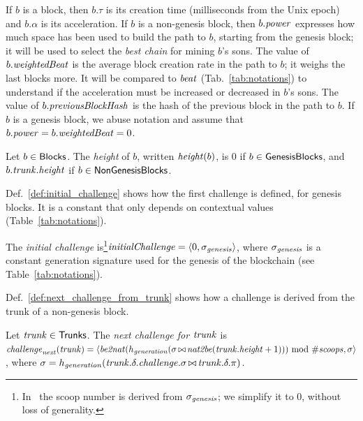%
If $b$ is a block, then $b.\tau$ is its creation time (milliseconds from the Unix epoch)
and $b.\alpha$ is its acceleration. If $b$ is a non-genesis block, then
$b.{\mathit{power}}$ expresses how much space has been used to build the path to $b$,
starting from the genesis block; it will be used to select the \emph{best chain} for mining
$b$'s sons. The value of $b.\mathit{weightedBeat}$ is the average block creation rate
in the path to $b$; it weighs the last blocks more. It will be
compared to ${\mathit{beat}}$ (Tab.~\ref{tab:notations}) to understand if the acceleration
must be increased or decreased in $b$'s sons.
The value of $b.{\mathit{previousBlockHash}}$ is the hash of the previous block in the path to $b$.
If $b$ is a genesis block, we abuse notation and assume that $b.{\mathit{power}}=b.\mathit{weightedBeat}=0$.

\begin{definition}\label{def:block_height}
  Let $b\in{\mathsf{Blocks}}$. The \emph{height} of $b$, written ${\mathit{height}}(b)$,
  is $0$ if $b\in{\mathsf{GenesisBlocks}}$, and $b.{\mathit{trunk}}.{\mathit{height}}$ if $b\in{\mathsf{NonGenesisBlocks}}$.  
\end{definition}
%
Def.~\ref{def:initial_challenge} shows how the first challenge is defined, for genesis blocks.
It is a constant that only depends on contextual values (Table~\ref{tab:notations}).
%
\begin{definition}[$\initialchallenge$]\label{def:initial_challenge}
  The \emph{initial challenge} is\footnote{In~\cite{SignumPlotting}
  the scoop number is derived from $\sigma_{\mathit{genesis}}$; we simplify it to $0$, without loss
  of generality.}${\mathit{initialChallenge}}=\langle 0,\sigma_{\mathit{genesis}}\rangle$,
  where $\sigma_{\mathit{genesis}}$ is a constant generation signature used for the genesis of the blockchain
  (see Table~\ref{tab:notations}).
\end{definition}
%
Def.~\ref{def:next_challenge_from_trunk}
shows how a challenge is derived from the trunk of a non-genesis block.
%
\begin{definition}[$\nextchallenge(\trunk)$]\label{def:next_challenge_from_trunk}
  Let ${\mathit{trunk}}\in{\mathsf{Trunks}}$. The \emph{next challenge for ${\mathit{trunk}}$} is
  $%
  \nextchallenge(\trunk)=
    \langle\betonat(h_\generation(\sigma\append\nattobe(\trunk.\height+1)))\text{ mod }\numberofscoops,\sigma\rangle
  $, %
  where
  $%
  \sigma=h_\generation(\trunk.\delta.\challenge.\sigma\append\trunk.\delta.\pi)
  $.%
\end{definition}
